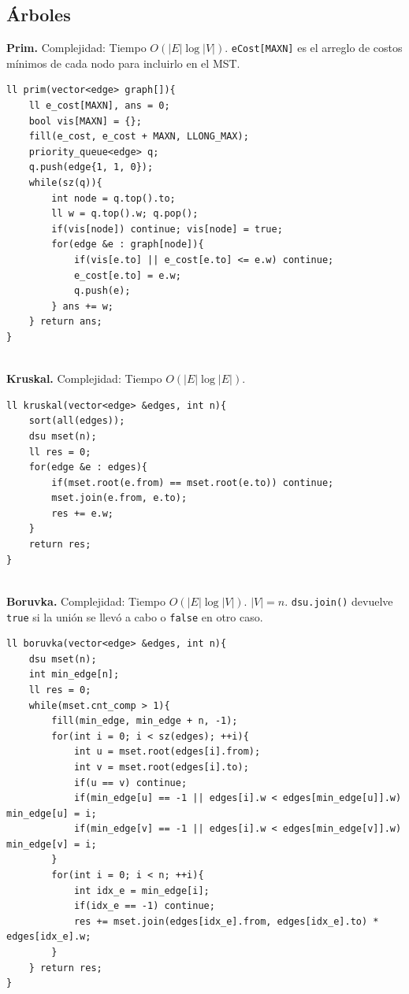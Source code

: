 \documentclass[10pt,spanish,mexico]{article}
\numberwithin{equation}{section}
\newcommand{\pa}[1]{\left( #1 \right)}
\begin{document}
\begin{multicols}{2}
\hrulefill
\subsection{Árboles}
\textbf{Prim.} Complejidad: Tiempo $O(|E| \log |V|)$. \texttt{eCost[MAXN]} es el arreglo de costos mínimos de cada nodo para incluirlo en el MST.
\begin{verbatim}
ll prim(vector<edge> graph[]){
    ll e_cost[MAXN], ans = 0;
    bool vis[MAXN] = {};
    fill(e_cost, e_cost + MAXN, LLONG_MAX);
    priority_queue<edge> q;
    q.push(edge{1, 1, 0});
    while(sz(q)){
        int node = q.top().to;
        ll w = q.top().w; q.pop();
        if(vis[node]) continue; vis[node] = true;
        for(edge &e : graph[node]){
            if(vis[e.to] || e_cost[e.to] <= e.w) continue;
            e_cost[e.to] = e.w;
            q.push(e);
        } ans += w;
    } return ans;
}
\end{verbatim}

\vspace{-1.2\baselineskip}
\hrulefill\\
\textbf{Kruskal.} Complejidad: Tiempo $O\pa{|E|\log |E|}$.
\begin{verbatim}
ll kruskal(vector<edge> &edges, int n){
    sort(all(edges));
    dsu mset(n);
    ll res = 0;
    for(edge &e : edges){
        if(mset.root(e.from) == mset.root(e.to)) continue;
        mset.join(e.from, e.to);
        res += e.w;
    }
    return res;
}
\end{verbatim}

\vspace{-1.2\baselineskip}
\hrulefill\\
\textbf{Boruvka.} Complejidad: Tiempo $O\pa{|E|\log |V|}$. $|V| = n$. \texttt{dsu.join()} devuelve \texttt{true} si la unión se llevó a cabo o \texttt{false} en otro caso.
\begin{verbatim}
ll boruvka(vector<edge> &edges, int n){
    dsu mset(n);
    int min_edge[n];
    ll res = 0;
    while(mset.cnt_comp > 1){
        fill(min_edge, min_edge + n, -1);
        for(int i = 0; i < sz(edges); ++i){
            int u = mset.root(edges[i].from);
            int v = mset.root(edges[i].to);
            if(u == v) continue;
            if(min_edge[u] == -1 || edges[i].w < edges[min_edge[u]].w) min_edge[u] = i;
            if(min_edge[v] == -1 || edges[i].w < edges[min_edge[v]].w) min_edge[v] = i;
        }
        for(int i = 0; i < n; ++i){
            int idx_e = min_edge[i];
            if(idx_e == -1) continue;
            res += mset.join(edges[idx_e].from, edges[idx_e].to) * edges[idx_e].w;
        }
    } return res;
}
\end{verbatim}


\end{multicols}
\end{document}
